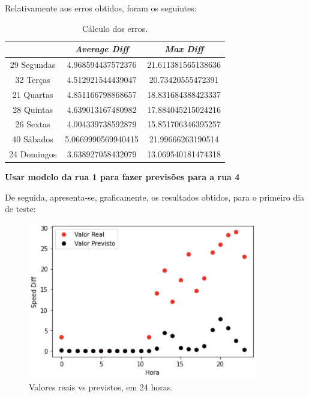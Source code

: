 \documentclass[a4paper, 12pt]{article}
\begin{document}
Relativamente aos erros obtidos, foram os seguintes:

\begin{table}[H]
	\centering
	\begin{tabular}{||c||c|c||}
		\hline\hline
		& \textit{Average Diff} & \textit{Max Diff} \\
		\hline\hline
		29 Segundas & 4.968594437572376
 & 21.611381565138636 \\
		\hline
		32 Terças  &
4.512921544439047
 & 20.73420555472391\\
		\hline
		21 Quartas & 4.851166798868657

 & 18.831684388423337	\\
		\hline
		28 Quintas  & 
4.639013167480982
 &	17.884045215024216\\
		\hline
		26 Sextas & 
4.004339738592879 & 15.851706346395257 \\
		\hline
		40 Sábados  & 5.0669990569940415
 & 21.99666263190514 \\
		\hline
		24 Domingos & 
3.638927058432079
 & 13.069540181474318

\\
		\hline\hline
	\end{tabular}
	\label{table:mod1_rua3}
	\caption{Cálculo dos erros.}
\end{table}

\vspace{0.5cm}
\textbf{Usar modelo da rua 1 para fazer previsões para a rua 4}

De seguida, apresenta-se, graficamente, os resultados obtidos, para o primeiro dia de teste:

\begin{figure}[H]
	\centering
	\includegraphics[width=10cm]{resultados/real_prev_mod1_rua4.png}
	\caption{Valores reais vs previstos, em 24 horas.}
\end{figure}
\end{document}
